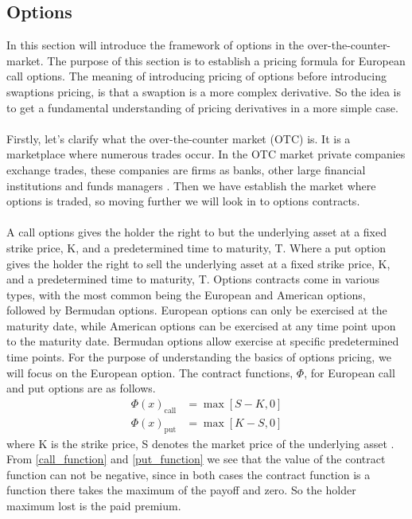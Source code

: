 \subsection{Options}
In this section will introduce the framework of options in the over-the-counter-market. 
The purpose of this section is to establish a pricing formula for European call options.
The meaning of introducing pricing of options before introducing swaptions pricing, is that a swaption is  a 
more complex derivative. So the idea is to get a fundamental understanding of pricing derivatives in a more simple case.
\\\\
Firstly, let's clarify what the over-the-counter market (OTC) is. It is  a marketplace where numerous trades occur.
In the OTC market private companies exchange trades, these companies are firms as banks, other 
large financial institutions and funds managers \cite{Hull}. Then we have establish the market where 
options is traded, so moving further we will look in to options contracts. 
\\\\
A call options gives the holder the right to but the underlying asset at a fixed strike price, K, and a 
predetermined time to maturity, T. Where a put option gives the holder the right to sell the underlying asset at a fixed
strike price, K, and a predetermined time to maturity, T. Options contracts come in various types, with the 
most common being the European and American options, followed by Bermudan options. European options can only 
be exercised at the maturity date, while American options can be exercised at any time point upon to the maturity date.
Bermudan options allow exercise at specific predetermined time points.
For the purpose of understanding the basics of options pricing, we will focus on the European option. 
The contract functions, $\Phi$, for European call and put options are as follows.
\begin{align}
    \Phi(x)_{\text{call}} &=  \max[S-K,0] \label{call_function}\\ 
    \Phi(x)_{\text{put}} &= \max [K-S,0] \label{put_function}
\end{align}
where K is the strike price, S denotes the market price of the underlying asset \cite{Bjork}. From \autoref{call_function} and \autoref{put_function} we see
that the value of the contract function can not be negative, since in both cases the contract function is a 
function there takes the maximum of the payoff and zero. So the holder maximum lost is the paid premium. 
